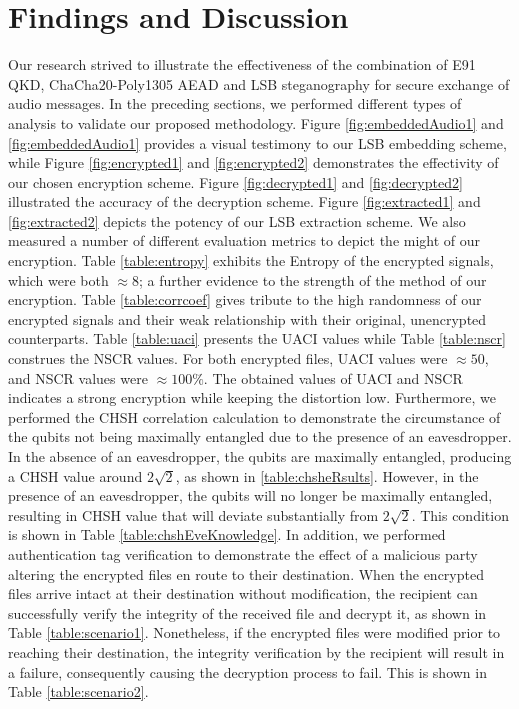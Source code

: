 \documentclass{article}
\begin{document}
\section{Findings and Discussion}
\label{sec:discussion}
Our research strived to illustrate the effectiveness of the combination of E91 QKD, ChaCha20-Poly1305 AEAD and LSB steganography for secure exchange of audio messages. In the preceding sections, we performed different types of analysis to validate our proposed methodology. Figure \ref{fig:embeddedAudio1} and \ref{fig:embeddedAudio1} provides a visual testimony to our LSB embedding scheme, while Figure \ref{fig:encrypted1} and \ref{fig:encrypted2} demonstrates the effectivity of our chosen encryption scheme. Figure \ref{fig:decrypted1} and \ref{fig:decrypted2} illustrated the accuracy of the decryption scheme. Figure \ref{fig:extracted1} and \ref{fig:extracted2} depicts the potency of our LSB extraction scheme. We also measured a number of different evaluation metrics to depict the might of our encryption. Table \ref{table:entropy} exhibits the Entropy of the encrypted signals, which were both $\approx8$; a further evidence to the strength of the method of our encryption. Table \ref{table:corrcoef} gives tribute to the high randomness of our encrypted signals and their weak relationship with their original, unencrypted counterparts. Table \ref{table:uaci} presents the UACI values while Table \ref{table:nscr} construes the NSCR values. For both encrypted files, UACI values were $\approx50$, and NSCR values were $\approx100\%$. The obtained values of UACI and NSCR indicates a strong encryption while keeping the distortion low. Furthermore, we performed the CHSH correlation calculation to demonstrate the circumstance of the qubits not being maximally entangled due to the presence of an eavesdropper. In the absence of an eavesdropper, the qubits are maximally entangled, producing a CHSH value around $2\sqrt{2}$, as shown in \ref{table:chsheRsults}. However, in the presence of an eavesdropper, the qubits will no longer be maximally entangled, resulting in CHSH value that will deviate substantially from $2\sqrt{2}$. This condition is shown in Table \ref{table:chshEveKnowledge}. In addition, we performed authentication tag verification to demonstrate the effect of a malicious party altering the encrypted files en route to their destination. When the encrypted files arrive intact at their destination without modification, the recipient can successfully verify the integrity of the received file and decrypt it, as shown in Table \ref{table:scenario1}. Nonetheless, if the encrypted files were modified prior to reaching their destination, the integrity verification by the recipient will result in a failure, consequently causing the decryption process to fail. This is shown in Table \ref{table:scenario2}.
\end{document}
